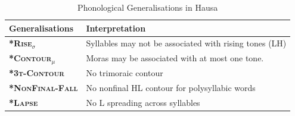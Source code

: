 \begin{table}
	\centering
	\begin{tabular}{ll}
		\toprule
		\textbf{Generalisations} & \textbf{Interpretation}                              \\
		\midrule
		\textbf{\textsc{*Rise$_\sigma$}}     & Syllables may not be associated with rising tones (LH) \\
		\textbf{\textsc{*Contour$_{\mu}$}}   & Moras may be associated with at most one tone.      \\
		\textbf{\textsc{*3t-Contour}}        & No trimoraic contour  \\
		\textbf{\textsc{*NonFinal-Fall}}     & No nonfinal HL contour for polysyllabic words         \\
		\textbf{\textsc{*Lapse}}             & No L spreading across syllables \\
		\bottomrule
	\end{tabular}
	\caption{Phonological Generalisations in Hausa}
	\label{rules}
\end{table}
